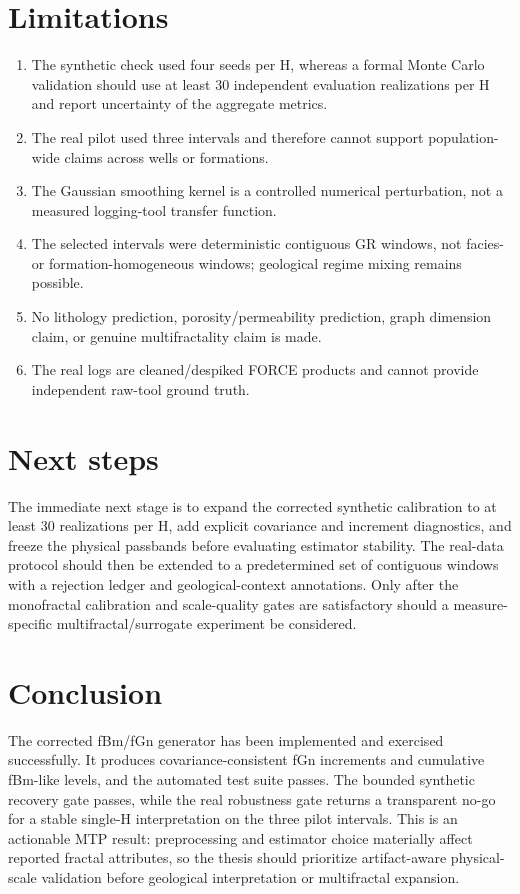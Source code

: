 \documentclass[11pt,a4paper]{article}
\begin{document}
\section{Limitations}
\begin{enumerate}
\item The synthetic check used four seeds per H, whereas a formal Monte Carlo validation should use at least 30 independent evaluation realizations per H and report uncertainty of the aggregate metrics.
\item The real pilot used three intervals and therefore cannot support population-wide claims across wells or formations.
\item The Gaussian smoothing kernel is a controlled numerical perturbation, not a measured logging-tool transfer function.
\item The selected intervals were deterministic contiguous GR windows, not facies- or formation-homogeneous windows; geological regime mixing remains possible.
\item No lithology prediction, porosity/permeability prediction, graph dimension claim, or genuine multifractality claim is made.
\item The real logs are cleaned/despiked FORCE products and cannot provide independent raw-tool ground truth.
\end{enumerate}

\section{Next steps}
The immediate next stage is to expand the corrected synthetic calibration to at least 30 realizations per H, add explicit covariance and increment diagnostics, and freeze the physical passbands before evaluating estimator stability. The real-data protocol should then be extended to a predetermined set of contiguous windows with a rejection ledger and geological-context annotations. Only after the monofractal calibration and scale-quality gates are satisfactory should a measure-specific multifractal/surrogate experiment be considered.

\section{Conclusion}
The corrected fBm/fGn generator has been implemented and exercised successfully. It produces covariance-consistent fGn increments and cumulative fBm-like levels, and the automated test suite passes. The bounded synthetic recovery gate passes, while the real robustness gate returns a transparent no-go for a stable single-H interpretation on the three pilot intervals. This is an actionable MTP result: preprocessing and estimator choice materially affect reported fractal attributes, so the thesis should prioritize artifact-aware physical-scale validation before geological interpretation or multifractal expansion.
\end{document}
